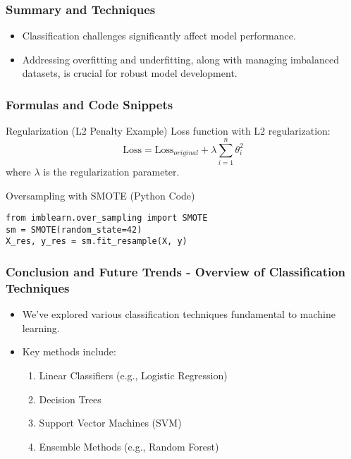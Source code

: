 \documentclass{beamer}
\begin{document}
\begin{frame}[fragile]
    \frametitle{Summary and Techniques}
    \begin{itemize}
        \item Classification challenges significantly affect model performance.
        \item Addressing overfitting and underfitting, along with managing imbalanced datasets, is crucial for robust model development.
    \end{itemize}
\end{frame}

\begin{frame}[fragile]
    \frametitle{Formulas and Code Snippets}
    \begin{block}{Regularization (L2 Penalty Example)}
        Loss function with L2 regularization:  
        \begin{equation}
            \text{Loss} = \text{Loss}_{original} + \lambda \sum_{i=1}^{n} \theta_i^2
        \end{equation}
        where \( \lambda \) is the regularization parameter.
    \end{block}
    
    \begin{block}{Oversampling with SMOTE (Python Code)}
    \begin{lstlisting}
from imblearn.over_sampling import SMOTE
sm = SMOTE(random_state=42)
X_res, y_res = sm.fit_resample(X, y)
    \end{lstlisting}
    \end{block}
\end{frame}

\begin{frame}[fragile]
    \frametitle{Conclusion and Future Trends - Overview of Classification Techniques}
    \begin{itemize}
        \item We've explored various classification techniques fundamental to machine learning.
        \item Key methods include:
        \begin{enumerate}
            \item Linear Classifiers (e.g., Logistic Regression)
            \item Decision Trees
            \item Support Vector Machines (SVM)
            \item Ensemble Methods (e.g., Random Forest)
        \end{enumerate}
    \end{itemize}
\end{frame}
\end{document}
